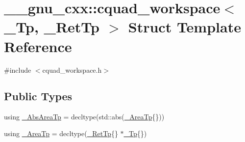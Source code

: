 \hypertarget{struct____gnu__cxx_1_1cquad__workspace}{}\section{\+\_\+\+\_\+gnu\+\_\+cxx\+:\+:cquad\+\_\+workspace$<$ \+\_\+\+Tp, \+\_\+\+Ret\+Tp $>$ Struct Template Reference}
\label{struct____gnu__cxx_1_1cquad__workspace}


{\ttfamily \#include $<$cquad\+\_\+workspace.\+h$>$}

\subsection*{Public Types}
\begin{DoxyCompactItemize}
\item 
using \hyperlink{struct____gnu__cxx_1_1cquad__workspace_a7abfe6354869dc61f6109c9e807ec152}{\+\_\+\+Abs\+Area\+Tp} = decltype(std\+::abs(\hyperlink{struct____gnu__cxx_1_1cquad__workspace_a8eede64f10ac7bbf817992cd3d06fa8f}{\+\_\+\+Area\+Tp}\{\}))
\item 
using \hyperlink{struct____gnu__cxx_1_1cquad__workspace_a8eede64f10ac7bbf817992cd3d06fa8f}{\+\_\+\+Area\+Tp} = decltype(\hyperlink{namespace____gnu__cxx_a886e03ece3d53ff7fa6c098a40f93fa5}{\+\_\+\+Ret\+Tp}\{\} $\ast$\hyperlink{namespace____gnu__cxx_a3b19a9c800ca194374ef9172290f7d79}{\+\_\+\+Tp}\{\})
\end{DoxyCompactItemize}
